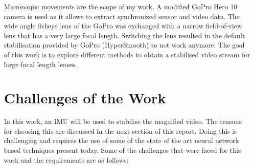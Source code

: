 Microscopic movements are the scope of my work. A modified GoPro Hero 10 camera is used as it allows to extract synchronized sensor and video data. The wide angle fisheye lens of the GoPro was exchanged with a narrow field-of-view lens that has a very large focal length. Switching the lens resulted in the default stabilisation provided by GoPro (HyperSmooth) to not work anymore. The goal of this work is to explore different methods to obtain a stabilised video stream for large focal length lenses.





\section{Challenges of the Work}
In this work, an IMU will be used to stabilise the magnified video. The reasons for choosing this are discussed in the next section of this report. Doing this is challenging and requires the use of some of the state of the art neural network based techniques present today. Some of the challenges that were faced for this work and the requirements are as follows:

